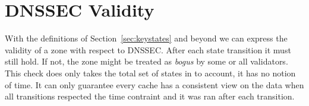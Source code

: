 \documentclass[twoside,english, a4paper]{article}
\begin{document}


\section{DNSSEC Validity} \label{validity}

With the definitions of Section~\ref{sec:keystates} and beyond we can
express the validity of a zone with respect to DNSSEC. After each state
transition it must still hold. If not, the zone might be treated as
\emph{bogus} by some or all validators. This check does only takes the 
total set of states in to account, it has no notion of time. It can
only guarantee every cache has a consistent view on the data when all
transitions respected the time contraint and it was ran after each
transition.
\end{document}

